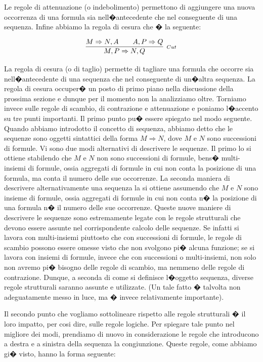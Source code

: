 \documentclass[a4paper,12pt]{aphex}
\begin{document}
\noindent Le regole di attenuazione (o indebolimento) permettono di aggiungere una nuova occorrenza di una formula sia nell�antecedente che nel conseguente di una sequenza.
Infine abbiamo la regola di cesura che � la seguente:

$$\infer[_{Cut}]{M, P\Rightarrow N, Q}{M\Rightarrow N, A \qquad A, P\Rightarrow Q}$$

\vspace{0.2cm}


\noindent La regola di cesura (o di taglio) permette di tagliare una formula che occorre sia nell�antecedente di una sequenza che nel conseguente di un�altra sequenza.  La regola di cesura occuper� un posto di primo piano nella discussione della prossima sezione e dunque per il momento non la analizziamo oltre. Torniamo invece sulle regole di scambio, di contrazione e attenuazione e poniamo l�accento su tre punti importanti.
Il primo punto pu� essere spiegato nel modo seguente. Quando abbiamo introdotto il concetto di sequenza, abbiamo detto che le sequenze sono oggetti sintattici della forma $M\Rightarrow N$, dove $M$ e $N$ sono successioni di formule. Vi sono due modi alternativi di descrivere le sequenze. Il primo lo si ottiene stabilendo che $M$ e $N$ non sono successioni di formule, bens� multi-insiemi di formule, ossia aggregati di formule in cui non conta la posizione di una formula, ma conta il numero delle sue occorrenze. La seconda maniera di descrivere alternativamente una sequenza la si ottiene assumendo che $M$ e $N$ sono insieme di formule, ossia aggregati di formule in cui non conta n� la posizione di una formula n� il numero delle sue occorrenze. Queste nuove maniere di descrivere le sequenze sono estremamente legate con le regole strutturali che devono essere assunte nel corrispondente calcolo delle sequenze. Se infatti si lavora con multi-insiemi piuttosto che con successioni di formule, le regole di scambio possono essere omesse visto che non svolgono pi� alcuna funzione; se si lavora con insiemi di formule, invece che con successioni o multi-insiemi, non solo non avremo pi� bisogno delle regole di scambio, ma nemmeno delle regole di contrazione.  Dunque, a seconda di come si definisce l�oggetto sequenza, diverse regole strutturali saranno assunte e utilizzate. (Un tale fatto � talvolta non adeguatamente messo in luce, ma � invece relativamente importante).

Il secondo punto che vogliamo sottolineare rispetto alle regole strutturali � il loro impatto, per cosi dire, sulle regole logiche. Per spiegare tale punto nel migliore dei modi, prendiamo di nuovo in considerazione le regole che introducono a destra e a sinistra della sequenza la congiunzione. Queste regole, come abbiamo gi� visto, hanno la forma seguente:
\end{document}
